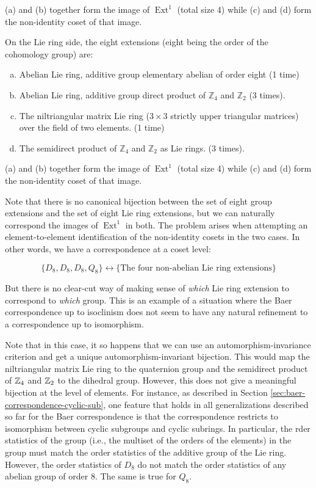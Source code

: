 (a) and (b) together form the image of $\operatorname{Ext}^1$ (total
size 4) while (c) and (d) form the non-identity coset of that
image.

On the Lie ring side, the eight extensions (eight being the order of the cohomology group) are:

\begin{enumerate}[(a)]
\item Abelian Lie ring, additive group elementary abelian of order eight (1 time)
\item Abelian Lie ring, additive group direct product of
  $\mathbb{Z}_4$ and $\mathbb{Z}_2$ (3 times).
\item The niltriangular matrix Lie ring ($3 \times 3$ strictly upper
  triangular matrices) over the field of two elements. (1 time)
\item The semidirect product of $\mathbb{Z}_4$ and $\mathbb{Z}_2$ as
  Lie rings. (3 times).
\end{enumerate}

(a) and (b) together form the image of $\operatorname{Ext}^1$ (total
size 4) while (c) and (d) form the non-identity coset of that
image.

Note that there is no canonical bijection between the set of eight
group extensions and the set of eight Lie ring extensions, but we can
naturally correspond the images of $\operatorname{Ext}^1$ in both. The
problem arises when attempting an element-to-element identification of the
non-identity cosets in the two cases. In other words, we have a
correspondence at a coset level:

$$\{ D_8, D_8, D_8, Q_8 \} \leftrightarrow \{ \text{The four non-abelian Lie ring extensions} \} $$

But there is no clear-cut way of making sense of {\em which} Lie ring
extension to correspond to {\em which} group. This is an example of a
situation where the Baer correspondence up to isoclinism does not seem
to have any natural refinement to a correspondence up to isomorphism.

Note that in this case, it so happens that we can use an
automorphism-invariance criterion and get a unique
automorphism-invariant bijection. This would map the niltriangular
matrix Lie ring to the quaternion group and the semidirect product of
$\mathbb{Z}_4$ and $\mathbb{Z}_2$ to the dihedral group. However, this does not give a
meaningful bijection at the level of elements. For instance, as
described in Section \ref{sec:baer-correspondence-cyclic-sub}, one
feature that holds in all generalizations described so far for the
Baer correspondence is that the correspondence restricts to
isomorphism between cyclic subgroups and cyclic subrings. In
particular, the rder statistics of the group (i.e., the multiset of
the orders of the elements) in the group must match the order
statistics of the additive group of the Lie ring. However, the order
statistics of $D_8$ do not match the order statistics of any abelian
group of order $8$. The same is true for $Q_8$.


